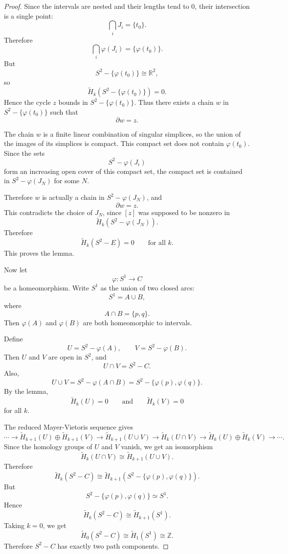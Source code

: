 \documentclass[11pt,a4paper]{article}
\theoremstyle{definition}
\theoremstyle{plain}
\theoremstyle{remark}
\newcommand{\1}{\mathbbm{1}}
\begin{document}
\begin{proof}
    Since the intervals are nested and their lengths tend to $0$, their intersection is a single point:
    \[
        \bigcap_i J_i = \{t_0\}.
    \]
    Therefore
    \[
        \bigcap_i \varphi(J_i)=\{\varphi(t_0)\}.
    \]
    But
    \[
        S^2-\{\varphi(t_0)\}\cong \mathbb R^2,
    \]
    so
    \[
        \widetilde H_k(S^2-\{\varphi(t_0)\})=0.
    \]
    Hence the cycle $z$ bounds in $S^2-\{\varphi(t_0)\}$. Thus there exists a chain $w$ in $S^2-\{\varphi(t_0)\}$ such that
    \[
        \partial w=z.
    \]

    The chain $w$ is a finite linear combination of singular simplices, so the union of the images of its simplices is compact. This compact set does not contain $\varphi(t_0)$. Since the sets
    \[
        S^2-\varphi(J_i)
    \]
    form an increasing open cover of this compact set, the compact set is contained in $S^2-\varphi(J_N)$ for some $N$.

    Therefore $w$ is actually a chain in $S^2-\varphi(J_N)$, and
    \[
        \partial w=z.
    \]
    This contradicts the choice of $J_N$, since $[z]$ was supposed to be nonzero in
    \[
        \widetilde H_k(S^2-\varphi(J_N)).
    \]
    Therefore
    \[
        \widetilde H_k(S^2-E)=0
        \qquad
        \text{for all } k.
    \]
    This proves the lemma.

    \medskip

    Now let
    \[
        \varphi:S^1\to C
    \]
    be a homeomorphism. Write $S^1$ as the union of two closed arcs:
    \[
        S^1=A\cup B,
    \]
    where
    \[
        A\cap B=\{p,q\}.
    \]
    Then $\varphi(A)$ and $\varphi(B)$ are both homeomorphic to intervals.

    Define
    \[
        U=S^2-\varphi(A),
        \qquad
        V=S^2-\varphi(B).
    \]
    Then $U$ and $V$ are open in $S^2$, and
    \[
        U\cap V = S^2-C.
    \]
    Also,
    \[
        U\cup V
        =
        S^2-\varphi(A\cap B)
        =
        S^2-\{\varphi(p),\varphi(q)\}.
    \]
    By the lemma,
    \[
        \widetilde H_k(U)=0
        \qquad
        \text{and}
        \qquad
        \widetilde H_k(V)=0
    \]
    for all $k$.

    The reduced Mayer-Vietoris sequence gives
    \[
        \cdots
        \to
        \widetilde H_{k+1}(U)\oplus \widetilde H_{k+1}(V)
        \to
        \widetilde H_{k+1}(U\cup V)
        \to
        \widetilde H_k(U\cap V)
        \to
        \widetilde H_k(U)\oplus \widetilde H_k(V)
        \to
        \cdots.
    \]
    Since the homology groups of $U$ and $V$ vanish, we get an isomorphism
    \[
        \widetilde H_k(U\cap V)
        \cong
        \widetilde H_{k+1}(U\cup V).
    \]
    Therefore
    \[
        \widetilde H_k(S^2-C)
        \cong
        \widetilde H_{k+1}(S^2-\{\varphi(p),\varphi(q)\}).
    \]
    But
    \[
        S^2-\{\varphi(p),\varphi(q)\}\simeq S^1.
    \]
    Hence
    \[
        \widetilde H_k(S^2-C)
        \cong
        \widetilde H_{k+1}(S^1).
    \]
    Taking $k=0$, we get
    \[
        \widetilde H_0(S^2-C)
        \cong
        \widetilde H_1(S^1)
        \cong
        \mathbb Z.
    \]
    Therefore $S^2-C$ has exactly two path components.
\end{proof}
\end{document}
